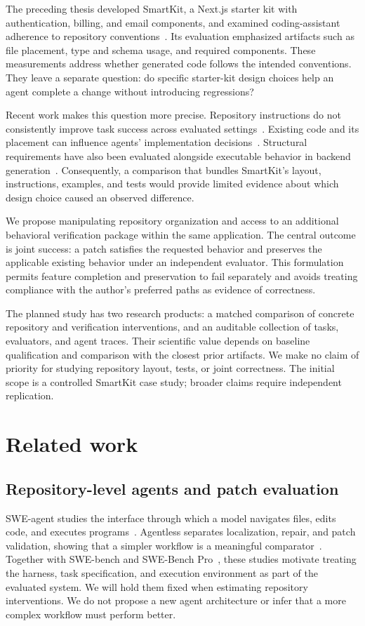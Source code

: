 \documentclass[11pt,a4paper]{article}
\begin{document}
The preceding thesis developed SmartKit, a Next.js starter kit with authentication, billing, and email components, and examined coding-assistant adherence to repository conventions~\cite{trieu2026thesis}. Its evaluation emphasized artifacts such as file placement, type and schema usage, and required components. These measurements address whether generated code follows the intended conventions. They leave a separate question: do specific starter-kit design choices help an agent complete a change without introducing regressions?

Recent work makes this question more precise. Repository instructions do not consistently improve task success across evaluated settings~\cite{gloaguen2026agents}. Existing code and its placement can influence agents' implementation decisions~\cite{zhu2026precedent}. Structural requirements have also been evaluated alongside executable behavior in backend generation~\cite{dente2026constraint}. Consequently, a comparison that bundles SmartKit's layout, instructions, examples, and tests would provide limited evidence about which design choice caused an observed difference.

We propose manipulating repository organization and access to an additional behavioral verification package within the same application. The central outcome is joint success: a patch satisfies the requested behavior and preserves the applicable existing behavior under an independent evaluator. This formulation permits feature completion and preservation to fail separately and avoids treating compliance with the author's preferred paths as evidence of correctness.

The planned study has two research products: a matched comparison of concrete repository and verification interventions, and an auditable collection of tasks, evaluators, and agent traces. Their scientific value depends on baseline qualification and comparison with the closest prior artifacts. We make no claim of priority for studying repository layout, tests, or joint correctness. The initial scope is a controlled SmartKit case study; broader claims require independent replication.

\section{Related work}
\subsection{Repository-level agents and patch evaluation}
SWE-agent studies the interface through which a model navigates files, edits code, and executes programs~\cite{yang2024sweagent}. Agentless separates localization, repair, and patch validation, showing that a simpler workflow is a meaningful comparator~\cite{xia2024agentless}. Together with SWE-bench and SWE-Bench Pro~\cite{jimenez2024swebench,deng2025swepro}, these studies motivate treating the harness, task specification, and execution environment as part of the evaluated system. We will hold them fixed when estimating repository interventions. We do not propose a new agent architecture or infer that a more complex workflow must perform better.
\end{document}
